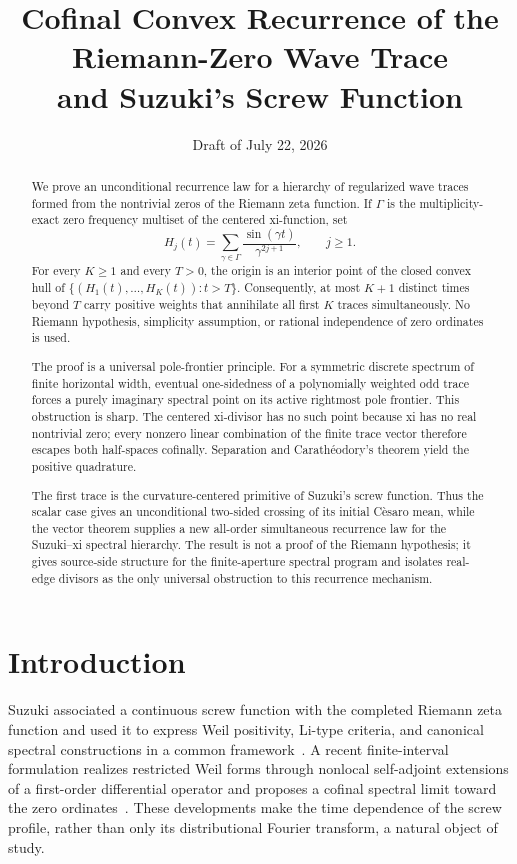 \documentclass[11pt]{article}
\title{Cofinal Convex Recurrence of the Riemann-Zero Wave Trace\\
and Suzuki's Screw Function}
\author{}
\date{Draft of July 22, 2026}
\theoremstyle{remark}
\begin{document}
\maketitle

\begin{abstract}
We prove an unconditional recurrence law for a hierarchy of regularized wave traces formed from
the nontrivial zeros of the Riemann zeta function.  If $\Gamma$ is the multiplicity-exact zero
frequency multiset of the centered xi-function, set
\[
  H_j(t)=\sum_{\gamma\in\Gamma}
       \frac{\sin(\gamma t)}{\gamma^{2j+1}},\qquad j\geq 1.
\]
For every $K\geq1$ and every $T>0$, the origin is an interior point of the closed convex hull of
$\{(H_1(t),\ldots,H_K(t)):t>T\}$.  Consequently, at most $K+1$ distinct times beyond $T$ carry
positive weights that annihilate all first $K$ traces simultaneously.  No Riemann hypothesis,
simplicity assumption, or rational independence of zero ordinates is used.

The proof is a universal pole-frontier principle.  For a symmetric discrete spectrum of finite
horizontal width, eventual one-sidedness of a polynomially weighted odd trace forces a purely
imaginary spectral point on its active rightmost pole frontier.  This obstruction is sharp.  The
centered xi-divisor has no such point because xi has no real nontrivial zero; every nonzero linear
combination of the finite trace vector therefore escapes both half-spaces cofinally.  Separation
and Carath\'eodory's theorem yield the positive quadrature.

The first trace is the curvature-centered primitive of Suzuki's screw function.  Thus the scalar
case gives an unconditional two-sided crossing of its initial C\`esaro mean, while the vector
theorem supplies a new all-order simultaneous recurrence law for the Suzuki--xi spectral
hierarchy.  The result is not a proof of the Riemann hypothesis; it gives source-side structure for
the finite-aperture spectral program and isolates real-edge divisors as the only universal
obstruction to this recurrence mechanism.
\end{abstract}

\section{Introduction}

Suzuki associated a continuous screw function with the completed Riemann zeta function and used
it to express Weil positivity, Li-type criteria, and canonical spectral constructions in a common
framework~\cite{Suzuki2023}.  A recent finite-interval formulation realizes restricted Weil forms
through nonlocal self-adjoint extensions of a first-order differential operator and proposes a
cofinal spectral limit toward the zero ordinates~\cite{Suzuki2026}.  These developments make the
time dependence of the screw profile, rather than only its distributional Fourier transform, a
natural object of study.
\end{document}
